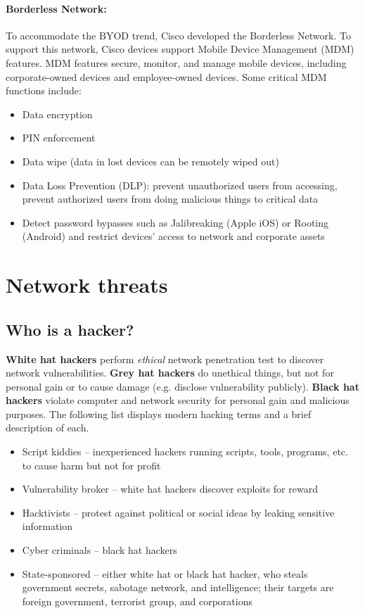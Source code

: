 \paragraph{Borderless Network:} To accommodate the BYOD trend, Cisco developed the Borderless Network. To support this network, Cisco devices support Mobile Device Management (MDM) features. MDM features secure, monitor, and manage mobile devices, including corporate-owned devices and employee-owned devices. Some critical MDM functions include:

\begin{itemize}
\item Data encryption
\item PIN enforcement
\item Data wipe (data in lost devices can be remotely wiped out)
\item Data Loss Prevention (DLP): prevent unauthorized users from accessing, prevent authorized users from doing malicious things to  critical data  
\item Detect password bypasses such as Jalibreaking (Apple iOS) or Rooting (Android) and restrict devices' access to network and corporate assets
\end{itemize}

\section{Network threats}

\subsection{Who is a hacker?}

\textbf{White hat hackers} perform \emph{ethical} network penetration test to discover network vulnerabilities. \textbf{Grey hat hackers} do unethical things, but not for personal gain or to cause damage (e.g. disclose vulnerability publicly). \textbf{Black hat hackers} violate computer and network security for personal gain and malicious purposes. The following list displays modern hacking terms and a brief description of each.\\

\begin{itemize}
\item Script kiddies -- inexperienced hackers running scripts, tools, programs, etc. to cause harm but not for profit
\item Vulnerability broker -- white hat hackers discover exploits for reward
\item Hacktivists -- protest against political or social ideas by leaking sensitive information
\item Cyber criminals -- black hat hackers
\item State-sponsored -- either white hat or black hat hacker, who steals government secrets, sabotage network, and intelligence; their targets are foreign government, terrorist group, and corporations
\end{itemize}

